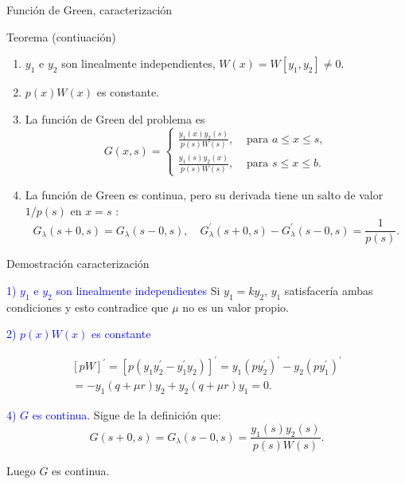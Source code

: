 \documentclass[xcolor=dvipsnames,a4paper,10pt,handout]{beamer}
\renewcommand{\emph}[1]{\textcolor{blue}{#1}}
\begin{document}
\begin{frame}{Función de Green, caracterización}

\begin{block}{Teorema (contiuación)}

\begin{enumerate}
 \item<+-> $y_1$ e $y_2$ son linealmente independientes, $W(x)=W\left[y_1, y_2\right] \neq 0$.
 
 \item<+-> $p(x) W(x)$ es constante.

 \item<+-> La función de Green del problema es
$$
G(x, s)= \begin{cases}\frac{y_1(x) y_2(s)}{p(s) W(s)}, & \text { para } a \leq x \leq s, \\ \frac{y_1(s) y_2(x)}{p(s) W(s)}, & \text { para } s \leq x \leq b .\end{cases}
$$

\item<+-> La función de Green es continua, pero su derivada tiene un salto de valor $1 / p(s)$ en $x=s$ :
$$
G_\lambda(s+0, s)=G_\lambda(s-0, s), \quad G_\lambda^{\prime}(s+0, s)-G_\lambda^{\prime}(s-0, s)=\frac{1}{p(s)} .
$$
\end{enumerate}

\end{block}


\end{frame}


\begin{frame}{Demostración caracterización}

\emph{1) $y_1$ e $y_2$ son linealmente independientes} Si $y_1=ky_2$, $y_1$ satisfacería ambas condiciones y esto contradice  que $\mu$ no es un valor propio.

\emph{ 2) $p(x) W(x)$ es constante} 

 
\begin{multline*}
{[p W]^{\prime} } =\left[p\left(y_1 y_2^{\prime}-y_1^{\prime} y_2\right)\right]^{\prime}=  y_1\left(py_2^{\prime}\right)^{\prime}-y_2\left(p y_1^{\prime}\right)^{\prime}\\
=-y_1(q+\mu r) y_2+y_2(q+\mu r) y_1=0 .
\end{multline*}
 
\emph{4) $G$ es continua.} Sigue de la definición que:
$$
G (s+0, s)=G_\lambda(s-0, s)=\frac{y_1(s) y_2(s)}{p(s) W(s)} .
$$

Luego $G$ es continua.
\end{frame}
\end{document}
